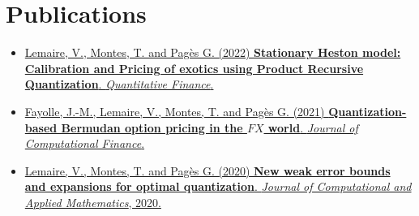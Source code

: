 \documentclass[]{deedy-resume-openfont}
\begin{document}
\hfill
\begin{minipage}[t]{0.59\textwidth}


	\section{Publications}
	\vspace{-0.1cm}
	\begin{itemize}
		\item[\diamond] \href{https://www.tandfonline.com/doi/abs/10.1080/14697688.2021.2023205?journalCode=rquf20}{Lemaire, V., Montes, T. and Pagès G. (2022) \textbf{Stationary Heston model: Calibration and Pricing of exotics using Product Recursive Quantization}. \textit{Quantitative Finance}.}

		\item[\diamond] \href{https://www.risk.net/journal-of-computational-finance/7869926/quantization-based-bermudan-option-pricing-in-the-foreign-exchange-world}{Fayolle, J.-M., Lemaire, V., Montes, T. and Pagès G. (2021) \textbf{Quantization-based Bermudan option pricing in the $FX$ world}. \textit{Journal of Computational Finance}.}

		\item[\diamond] \href{https://www.sciencedirect.com/science/article/abs/pii/S0377042719306752}{Lemaire, V., Montes, T. and Pagès G. (2020) \textbf{New weak error bounds and expansions for optimal quantization}. \textit{Journal of Computational and Applied Mathematics}, 2020.}
	\end{itemize}

	\vspace{-1.cm}
	\renewcommand\refname{\vskip -1.5em} %
	
	
	\nocite{*}

\end{minipage}
\end{document}
